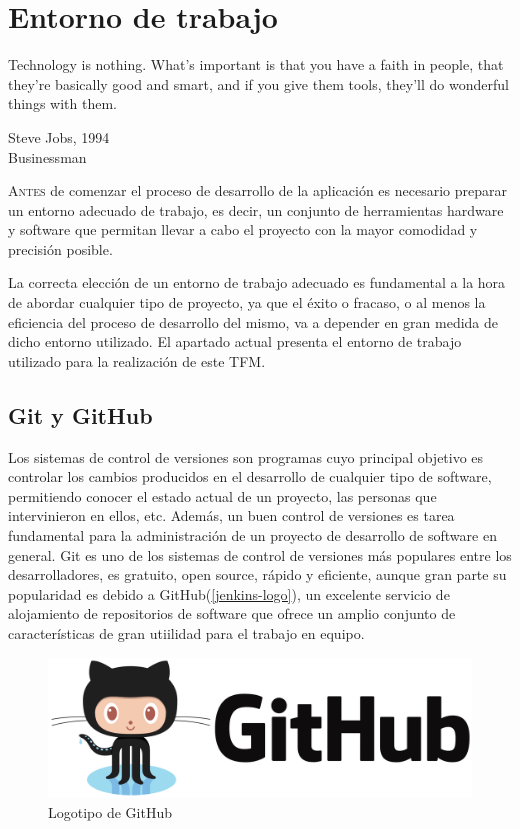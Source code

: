 \chapter{Entorno de trabajo}\label{chp-03}
\epigraph{Technology is nothing. What's important is that you have a faith in people, that they're basically good and smart, and if you give them tools, they'll do wonderful things with them.}{Steve Jobs, 1994\\Businessman}

\lettrine[lraise=-0.1, lines=2, loversize=0.2]{A}{ntes} de comenzar el proceso de desarrollo de la aplicación es necesario preparar un entorno adecuado de trabajo, es decir, un conjunto de herramientas hardware y software que permitan llevar a cabo el proyecto con la mayor comodidad y precisión posible.

La correcta elección de un entorno de trabajo adecuado es fundamental a la hora de abordar cualquier tipo de proyecto, ya que el éxito o fracaso, o al menos la eficiencia del proceso de desarrollo del mismo, va a depender en gran medida de dicho entorno utilizado.
El apartado actual presenta el entorno de trabajo utilizado para la realización de este \gls{TFM}.

\section{Git y GitHub}

Los sistemas de control de versiones son programas cuyo principal objetivo es controlar los cambios producidos en el desarrollo de cualquier tipo de software, permitiendo conocer el estado actual de un proyecto, las personas que intervinieron en ellos, etc. Además, un buen control de versiones es tarea fundamental para la administración de un proyecto de desarrollo de software en general\cite{alcazar2014}. Git es uno de los sistemas de control de versiones más populares entre los desarrolladores, es gratuito, open source, rápido y eficiente, aunque gran parte su popularidad es debido a GitHub(\autoref{jenkins-logo}), un excelente servicio de alojamiento de repositorios de software que ofrece un amplio conjunto de características de gran utiilidad para el trabajo en equipo.

\begin{figure}[htbp]
	\centering
	\includegraphics[width=0.80\linewidth]
	{entorno/figuras/github.png}
	\caption{Logotipo de GitHub}
	\label{github-logo}
\end{figure}

